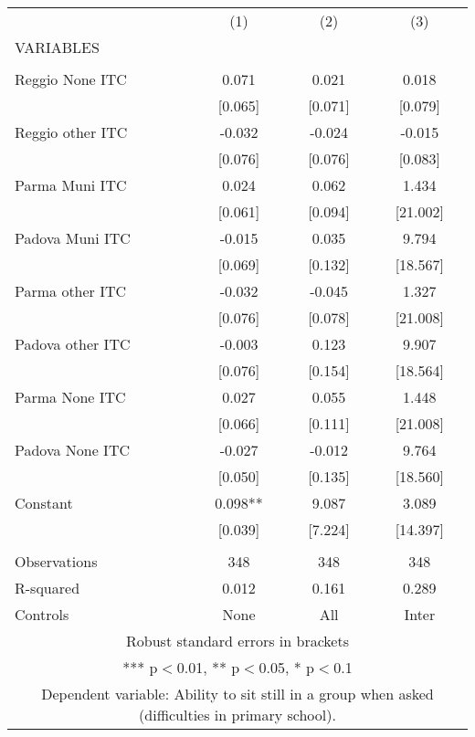 \begin{tabular}{lccc} \hline
 & (1) & (2) & (3) \\
VARIABLES &  &  &  \\ \hline
 &  &  &  \\
Reggio None ITC & 0.071 & 0.021 & 0.018 \\
 & [0.065] & [0.071] & [0.079] \\
Reggio other ITC & -0.032 & -0.024 & -0.015 \\
 & [0.076] & [0.076] & [0.083] \\
Parma Muni ITC & 0.024 & 0.062 & 1.434 \\
 & [0.061] & [0.094] & [21.002] \\
Padova Muni ITC & -0.015 & 0.035 & 9.794 \\
 & [0.069] & [0.132] & [18.567] \\
Parma other ITC & -0.032 & -0.045 & 1.327 \\
 & [0.076] & [0.078] & [21.008] \\
Padova other ITC & -0.003 & 0.123 & 9.907 \\
 & [0.076] & [0.154] & [18.564] \\
Parma None ITC & 0.027 & 0.055 & 1.448 \\
 & [0.066] & [0.111] & [21.008] \\
Padova None ITC & -0.027 & -0.012 & 9.764 \\
 & [0.050] & [0.135] & [18.560] \\
Constant & 0.098** & 9.087 & 3.089 \\
 & [0.039] & [7.224] & [14.397] \\
 &  &  &  \\
Observations & 348 & 348 & 348 \\
R-squared & 0.012 & 0.161 & 0.289 \\
 Controls & None & All & Inter \\ \hline
\multicolumn{4}{c}{ Robust standard errors in brackets} \\
\multicolumn{4}{c}{ *** p$<$0.01, ** p$<$0.05, * p$<$0.1} \\
\multicolumn{4}{c}{ Dependent variable: Ability to sit still in a group when asked (difficulties in primary school).} \\
\end{tabular}

